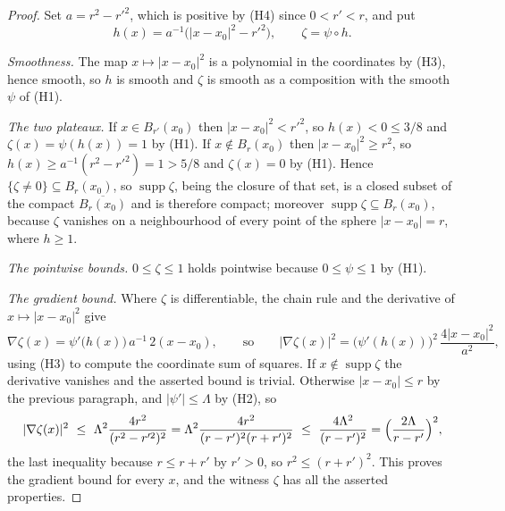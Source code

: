 \begin{proof}
Set $a=r^2-r'^2$, which is positive by (H4) since $0<r'<r$, and put
\[
h(x)=a^{-1}\bigl(|x-x_0|^2-r'^2\bigr),\qquad \zeta=\psi\circ h .
\]

\emph{Smoothness.}  The map $x\mapsto|x-x_0|^2$ is a polynomial in the
coordinates by (H3), hence smooth, so $h$ is smooth and $\zeta$ is smooth as a
composition with the smooth $\psi$ of (H1).

\emph{The two plateaux.}  If $x\in B_{r'}(x_0)$ then $|x-x_0|^2<r'^2$, so
$h(x)<0\le3/8$ and $\zeta(x)=\psi(h(x))=1$ by (H1).  If
$x\notin B_r(x_0)$ then $|x-x_0|^2\ge r^2$, so
$h(x)\ge a^{-1}(r^2-r'^2)=1>5/8$ and $\zeta(x)=0$ by (H1).  Hence
$\{\zeta\neq0\}\subseteq B_r(x_0)$, so $\operatorname{supp}\zeta$, being the
closure of that set, is a closed subset of the compact
$\overline{B_r(x_0)}$ and is therefore compact; moreover
$\operatorname{supp}\zeta\subseteq B_r(x_0)$, because $\zeta$ vanishes on a
neighbourhood of every point of the sphere $|x-x_0|=r$, where $h\ge1$.

\emph{The pointwise bounds.}  $0\le\zeta\le1$ holds pointwise because
$0\le\psi\le1$ by (H1).

\emph{The gradient bound.}  Where $\zeta$ is differentiable, the chain rule and
the derivative of $x\mapsto|x-x_0|^2$ give
\[
\nabla\zeta(x)=\psi'\bigl(h(x)\bigr)\,a^{-1}\,2(x-x_0),
\qquad\text{so}\qquad
|\nabla\zeta(x)|^2=\bigl(\psi'(h(x))\bigr)^2\,\frac{4|x-x_0|^2}{a^2},
\]
using (H3) to compute the coordinate sum of squares.  If
$x\notin\operatorname{supp}\zeta$ the derivative vanishes and the asserted
bound is trivial.  Otherwise $|x-x_0|\le r$ by the previous paragraph, and
$|\psi'|\le\Lambda$ by (H2), so
\[
|\nabla\zeta(x)|^2\ \le\ \Lambda^2\frac{4r^2}{(r^2-r'^2)^2}
=\Lambda^2\frac{4r^2}{(r-r')^2(r+r')^2}
\ \le\ \frac{4\Lambda^2}{(r-r')^2}
=\Bigl(\frac{2\Lambda}{r-r'}\Bigr)^{2},
\]
the last inequality because $r\le r+r'$ by $r'>0$, so
$r^2\le(r+r')^2$.  This proves the gradient bound for every $x$, and the
witness $\zeta$ has all the asserted properties.
\end{proof}
